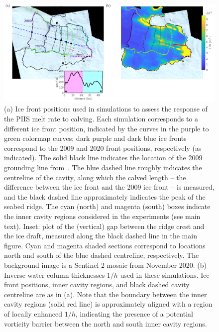 \documentclass[draft]{agujournal2019}
\begin{document}
\begin{figure}
    \centering
    \includegraphics[width =\textwidth]{../make_figures/plots/figure10_combined.pdf}
    \caption{(a) Ice front positions used in simulations to assess the response of the PIIS melt rate to calving. Each simulation corresponds to a different ice front position, indicated by the curves in the purple to green colormap curves; dark purple and dark blue ice fronts correspond to the 2009 and 2020 front positions, respectively (as indicated). The solid black line indicates the location of the 2009 grounding line from~. The blue dashed line roughly indicates the centreline of the cavity, along which the calved length -- the difference between the ice front and the 2009 ice front -- is measured, and the black dashed line approximately indicates the peak of the seabed ridge. The cyan (north) and magenta (south) boxes indicate the inner cavity regions considered in the experiments (see main text). Inset: plot of the (vertical) gap between the ridge crest and the ice draft, measured along the black dashed line in the main figure. Cyan and magenta shaded sections correspond to locations north and south of the blue dashed centreline, respectively. The background image is a Sentinel 2 mosaic from November 2020. (b) Inverse water column thicknesses $1/h$ used in these simulations. Ice front positions, inner cavity regions, and black dashed cavity centreline are as in (a).  Note that the boundary between the inner cavity regions (solid red line) is approximately aligned with a region of locally enhanced $1/h$, indicating the presence of a potential vorticity barrier between the north and south inner cavity regions.}
    \label{fig:figure10}
\end{figure}

\end{document}
